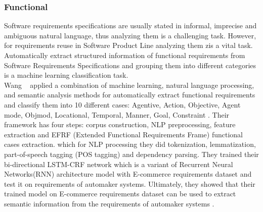\subsubsection{Functional}

Software requirements specifications are usually stated in informal, imprecise
and ambiguous natural language, thus analyzing them is a challenging task.
However, for requirements reuse in Software Product Line  analyzing them zis a vital task. Automatically extract
structured information of functional requirements from Software Requirements Specifications and grouping them into different
categories is a machine learning classification task\cite{7949577}. \\ 

Wang \etal~\cite{7949577} applied a combination of machine learning, natural
language processing, and semantic analysis methods for automatically extract functional requirements and classify
them into 10 different cases: Agentive, Action, Objective, Agent mode, Objmod, Locational, Temporal, Manner, Goal,
Constraint . Their framework has four
steps:
corpus construction, NLP preprocessing, feature extraction and  EFRF (Extended Functional Requirements
Frame) functional cases extraction. which for NLP processing they did
tokenization,   lemmatization, part-of-speech tagging (POS  tagging) and
dependency parsing. They trained their bi-directional LSTM-CRF network which is
a variant of Recurrent Neural Networks(RNN) architecture model with E-commerce
requirements dataset and test it on requirements of automaker systems.
Ultimately, they showed that their trained model on E-commerce requirements
dataset can be used to extract semantic information from the requirements of
automaker systems .

